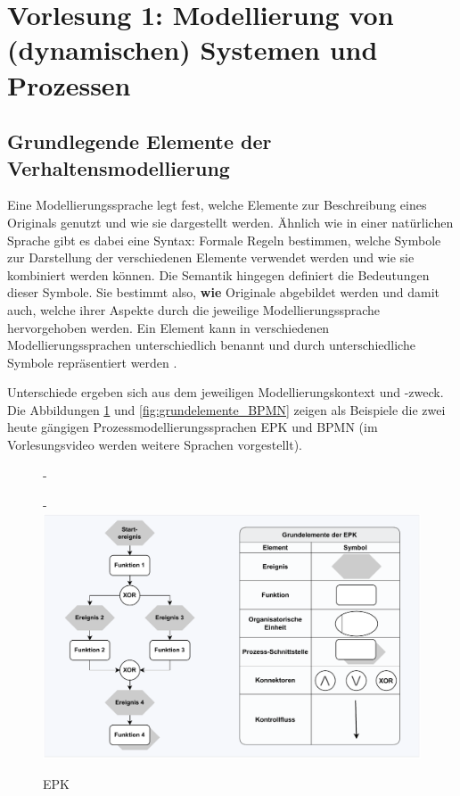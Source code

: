 \section[Vorlesung 1: Modellierung von (dynamischen) Systemen und\\ Prozessen]{Vorlesung 1: Modellierung von (dynamischen) Systemen und Prozessen}

\subsection*{Grundlegende Elemente der Verhaltensmodellierung}

Eine Modellierungssprache legt fest, 
welche Elemente zur Beschreibung eines Originals genutzt und wie sie dargestellt werden. Ähnlich wie in einer natürlichen Sprache gibt es dabei eine Syntax: Formale Regeln bestimmen, welche Symbole zur Darstellung der verschiedenen Elemente verwendet werden und wie sie kombiniert werden können. Die Semantik hingegen definiert die Bedeutungen dieser Symbole. Sie bestimmt also, \textbf{wie} Originale abgebildet werden und damit auch, welche ihrer Aspekte durch die jeweilige Modellierungssprache hervorgehoben werden. Ein Element kann in verschiedenen Modellierungssprachen unterschiedlich benannt und durch unterschiedliche Symbole repräsentiert werden \cite{ros12}.

Unterschiede ergeben sich aus dem jeweiligen Modellierungskontext und -zweck. Die Abbildungen \ref{fig:grundelemente_EPK} und \ref{fig:grundelemente_BPMN} zeigen als Beispiele die zwei heute gängigen Prozess\-model\-lie\-rungs\-sprachen EPK und BPMN (im Vorlesungsvideo werden weitere Sprachen vorgestellt).

\begin{figure}[t]
	\begin{addmargin*}[0cm]{-\marginparwidth}
	\begin{addmargin*}[0cm]{-\marginparsep}
		\centering
		\includegraphics[scale=0.9]{Bilder/Kapitel-5/grundelemente_EPK.pdf}
		\caption{EPK}
		\label{fig:grundelemente_EPK}
	\end{addmargin*}
	\end{addmargin*}
\end{figure}

